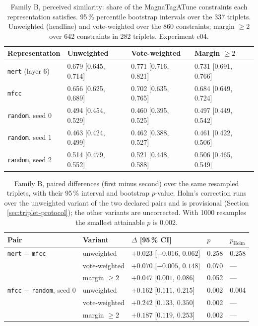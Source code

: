 \begin{table}[t]
  \centering
  \caption[Family B: agreement with the MagnaTagATune constraints]{Family B,
    perceived similarity: share of the MagnaTagATune
    constraints each representation satisfies. 95\,\% percentile bootstrap
    intervals over the 337 triplets. Unweighted (headline) and vote-weighted
    over the 860 constraints; margin $\geq 2$ over 642 constraints in 282
    triplets. Experiment e04.}
  \label{tab:proxy-family-b}
  \begin{tabular}{@{}llll@{}}
    \toprule
    Representation & Unweighted & Vote-weighted & Margin $\geq 2$ \\
    \midrule
    \texttt{mert} (layer 6) & 0.679 [0.645, 0.714] & 0.771 [0.716, 0.821] & 0.731 [0.691, 0.766] \\
    \texttt{mfcc}           & 0.656 [0.625, 0.689] & 0.702 [0.635, 0.765] & 0.684 [0.649, 0.724] \\
    \texttt{random}, seed 0 & 0.494 [0.454, 0.529] & 0.460 [0.395, 0.525] & 0.497 [0.449, 0.542] \\
    \texttt{random}, seed 1 & 0.463 [0.424, 0.499] & 0.462 [0.388, 0.527] & 0.461 [0.422, 0.506] \\
    \texttt{random}, seed 2 & 0.514 [0.479, 0.552] & 0.521 [0.448, 0.588] & 0.506 [0.465, 0.549] \\
    \bottomrule
  \end{tabular}
\end{table}

\begin{table}[t]
  \centering
  \caption[Family B: paired differences between representations]{Family B,
    paired differences (first minus second) over the same
    resampled triplets, with their 95\,\% interval and bootstrap $p$-value.
    Holm's correction runs over the unweighted variant of the two declared
    pairs and is provisional (Section \ref{sec:triplet-protocol}); the other
    variants are uncorrected. With 1000 resamples the smallest attainable
    $p$ is 0.002.}
  \label{tab:proxy-family-b-deltas}
  \begin{tabular}{@{}lllll@{}}
    \toprule
    Pair & Variant & $\Delta$ [95\,\% CI] & $p$ & $p_{\text{Holm}}$ \\
    \midrule
    \texttt{mert} $-$ \texttt{mfcc}     & unweighted    & $+0.023$ [$-0.016$, $0.062$] & 0.258 & 0.258 \\
                                        & vote-weighted & $+0.070$ [$-0.005$, $0.148$] & 0.070 & --- \\
                                        & margin $\geq 2$ & $+0.047$ [$0.001$, $0.086$] & 0.052 & --- \\
    \midrule
    \texttt{mfcc} $-$ \texttt{random}, seed 0 & unweighted    & $+0.162$ [$0.111$, $0.215$] & 0.002 & 0.004 \\
                                        & vote-weighted & $+0.242$ [$0.133$, $0.350$] & 0.002 & --- \\
                                        & margin $\geq 2$ & $+0.187$ [$0.119$, $0.253$] & 0.002 & --- \\
    \bottomrule
  \end{tabular}
\end{table}


